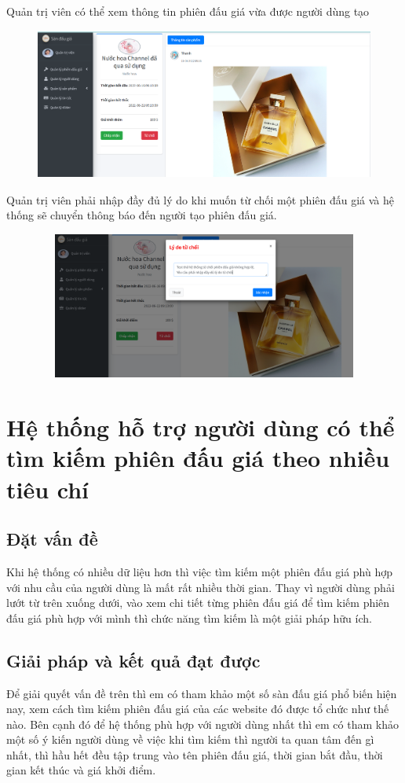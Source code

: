 \documentclass[../DoAn.tex]{subfiles}
\begin{document}
Quản trị viên có thể xem thông tin phiên đấu giá vừa được người dùng tạo
\begin{figure}[H]
    \centering
    \includegraphics[width=11.4cm,height=4.96cm]{Hinhve/adminconfirm.png}
\end{figure}
Quản trị viên phải nhập đầy đủ lý do khi muốn từ chối một phiên đấu giá và hệ thống sẽ chuyển thông báo đến người tạo phiên đấu giá.
\begin{figure}[H]
    \centering
    \includegraphics[width=11.4cm,height=4.83cm]{Hinhve/adminreject.png}
\end{figure}
\section{Hệ thống hỗ trợ người dùng có thể tìm kiếm phiên đấu giá theo nhiều tiêu chí}
\subsection{Đặt vấn đề}
Khi hệ thống có nhiều dữ liệu hơn thì việc tìm kiếm một phiên đấu giá phù hợp với nhu cầu của người dùng là mất rất nhiều thời gian. Thay vì người dùng phải lướt từ trên xuống dưới, vào xem chi tiết từng phiên đấu giá để tìm kiếm phiên đấu giá phù hợp với mình thì chức năng tìm kiếm là một giải pháp hữu ích.
\subsection{Giải pháp và kết quả đạt được}
Để giải quyết vấn đề trên thì em có tham khảo một số sàn đấu giá phổ biến hiện nay, xem cách tìm kiếm phiên đấu giá của các website đó được tổ chức như thế nào. Bên cạnh đó để hệ thống phù hợp với người dùng nhất thì em có tham khảo một số ý kiến người dùng về việc khi tìm kiếm thì người ta quan tâm đến gì nhất, thì hầu hết đều tập trung vào tên phiên đấu giá, thời gian bắt đầu, thời gian kết thúc và giá khởi điểm. 
\end{document}
